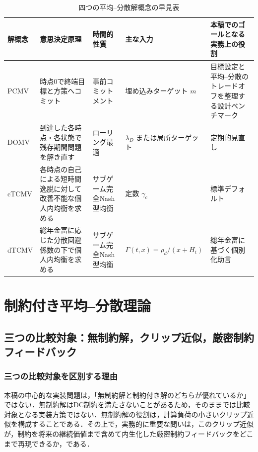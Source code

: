 \documentclass[10pt,a4paper]{article}
\theoremstyle{plain}
\theoremstyle{definition}
\begin{document}
\begin{table}[H]
\centering
\scriptsize
\caption{四つの平均--分散解概念の早見表}
\label{tab:four-concepts-guide}
\begin{tabularx}{\textwidth}{p{16mm}p{39mm}p{25mm}p{28mm}X}
\toprule
解概念 & 意思決定原理 & 時間的性質 & 主な入力 & 本稿でのゴールとなる実務上の役割 \\
\midrule
PCMV & 時点0で終端目標と方策へコミット & 事前コミットメント & 埋め込みターゲット $m$ & 目標設定と平均--分散のトレードオフを整理する設計ベンチマーク \\
DOMV & 到達した各時点・各状態で残存期間問題を解き直す & ローリング最適 & $\lambda_D$ または局所ターゲット & 定期的見直し \\
cTCMV & 各時点の自己による短時間逸脱に対して改善不能な個人内均衡を求める & サブゲーム完全Nash型均衡 & 定数 $\gamma_c$ & 標準デフォルト \\
dTCMV & 総年金富に応じた分散回避係数の下で個人内均衡を求める & サブゲーム完全Nash型均衡 & $\Gamma(t,x)=\rho_d/(x+H_t)$ & 総年金富に基づく個別化助言 \\
\bottomrule
\end{tabularx}
\end{table}


\section{制約付き平均--分散理論}
\label{sec:theory}

\subsection{三つの比較対象：無制約解，クリップ近似，厳密制約フィードバック}
\label{sec:strict-clip}

\subsubsection{三つの比較対象を区別する理由}

本稿の中心的な実装問題は，「無制約解と制約付き解のどちらが優れているか」ではない．無制約解はDC制約を満たさないことがあるため，そのままでは比較対象となる実装方策ではない．無制約解の役割は，計算負荷の小さいクリップ近似を構成することである．その上で，実務的に重要な問いは，このクリップ近似が，制約を将来の継続価値まで含めて内生化した厳密制約フィードバックをどこまで再現できるか，である．
\end{document}
